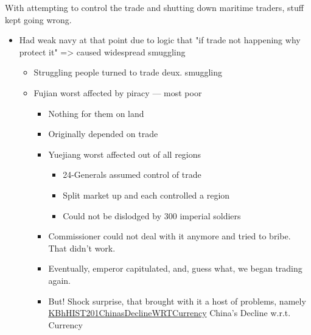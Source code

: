 \documentclass[letterpaper]{article}
\begin{document}
With attempting to control the trade and shutting down maritime traders,
stuff kept going wrong.

\begin{itemize}
\item Had weak navy at that point due to logic that "if trade not happening
why protect it" => caused widespread smuggling

\begin{itemize}
\item Struggling people turned to trade deux. smuggling
\item Fujian worst affected by piracy --- most poor

\begin{itemize}
\item Nothing for them on land
\item Originally depended on trade
\item Yuejiang worst affected out of all regions

\begin{itemize}
\item 24-Generals assumed control of trade
\item Split market up and each controlled a region
\item Could not be dislodged by 300 imperial soldiers\\
\end{itemize}

\item Commissioner could not deal with it anymore and tried to bribe.
That didn't work.
\item Eventually, emperor capitulated, and, guess what, we began trading
again.
\item But! Shock surprise, that brought with it a host of problems,
namely
\href{KBhHIST201ChinasDeclineWRTCurrency.org}{KBhHIST201ChinasDeclineWRTCurrency}
China's Decline w.r.t. Currency
\end{itemize}
\end{itemize}
\end{itemize}
\end{document}
